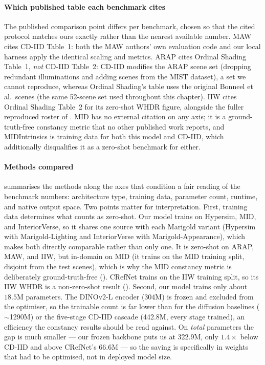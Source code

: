 \paragraph{Which published table each benchmark cites}
The published comparison point differs per benchmark, chosen so that the cited
protocol matches ours exactly rather than the nearest available number.
MAW cites CD-IID Table~1: both the MAW authors' own evaluation code and our
local harness apply the identical scaling and metrics.
ARAP cites Ordinal Shading Table~1, \emph{not} CD-IID Table~2: CD-IID modifies
the ARAP scene set (dropping redundant illuminations and adding scenes from the
MIST dataset), a set we cannot reproduce, whereas Ordinal Shading's table uses
the original Bonneel et al.\ scenes (the same 52-scene set used throughout
this chapter). IIW cites Ordinal Shading Table~2 for its zero-shot WHDR figure,
alongside the fuller reproduced roster of .
MID has no external citation on any axis; it is a ground-truth-free constancy
metric that no other published work reports, and MIDIntrinsics is training data
for both this model and CD-IID, which additionally disqualifies it as a
zero-shot benchmark for either.

\paragraph{Methods compared}
 summarises the methods along the axes that condition a
fair reading of the benchmark numbers: architecture type, training data,
parameter count, runtime, and native output space.
Two points matter for interpretation.
First, training data determines what counts as zero-shot.
Our model trains on Hypersim, MID, and InteriorVerse, so it shares one source
with each Marigold variant (Hypersim with Marigold-Lighting and InteriorVerse
with Marigold-Appearance), which makes both directly comparable rather than only
one.
It is zero-shot on ARAP, MAW, and IIW, but in-domain on MID (it trains on the
MID training split, disjoint from the test scenes), which is why the MID
constancy metric is deliberately ground-truth-free ().
CRefNet trains on the IIW training split, so its IIW WHDR is a non-zero-shot
result ().
Second, our model trains only about $18.5$M parameters. The DINOv2-L encoder
($304$M) is frozen and excluded from the optimiser, so the trainable count is far
lower than for the diffusion baselines ($\sim$1290M) or the five-stage CD-IID
cascade (442.8M, every stage trained), an efficiency the constancy results should
be read against. On \emph{total} parameters the gap is much smaller --- our frozen
backbone puts us at 322.9M, only $1.4\times$ below CD-IID and above CRefNet's
66.6M --- so the saving is specifically in weights that had to be optimised, not in
deployed model size.

